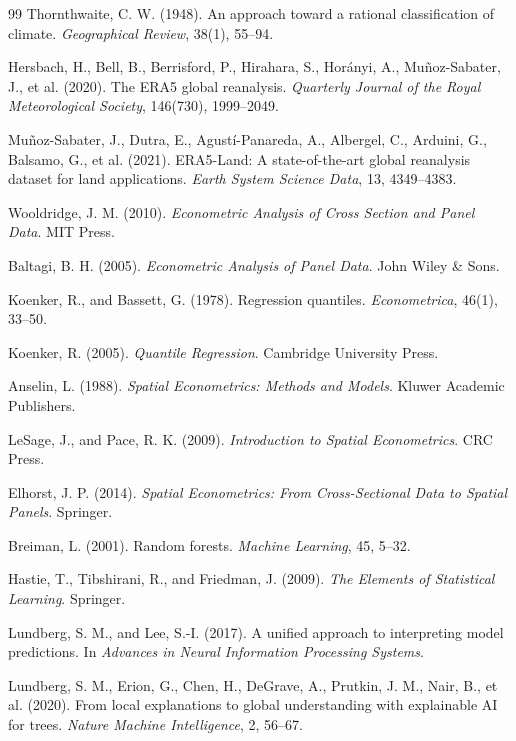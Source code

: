 \documentclass[12pt,a4paper]{article}
\begin{document}
\begin{thebibliography}{99}
Thornthwaite, C. W. (1948).
An approach toward a rational classification of climate.
\textit{Geographical Review}, 38(1), 55--94.

Hersbach, H., Bell, B., Berrisford, P., Hirahara, S., Hor{\'a}nyi, A., Mu{\~n}oz-Sabater, J., et al. (2020).
The ERA5 global reanalysis.
\textit{Quarterly Journal of the Royal Meteorological Society}, 146(730), 1999--2049.

Mu{\~n}oz-Sabater, J., Dutra, E., Agust{\'i}-Panareda, A., Albergel, C., Arduini, G., Balsamo, G., et al. (2021).
ERA5-Land: A state-of-the-art global reanalysis dataset for land applications.
\textit{Earth System Science Data}, 13, 4349--4383.

Wooldridge, J. M. (2010).
\textit{Econometric Analysis of Cross Section and Panel Data}.
MIT Press.

Baltagi, B. H. (2005).
\textit{Econometric Analysis of Panel Data}.
John Wiley \& Sons.

Koenker, R., and Bassett, G. (1978).
Regression quantiles.
\textit{Econometrica}, 46(1), 33--50.

Koenker, R. (2005).
\textit{Quantile Regression}.
Cambridge University Press.

Anselin, L. (1988).
\textit{Spatial Econometrics: Methods and Models}.
Kluwer Academic Publishers.

LeSage, J., and Pace, R. K. (2009).
\textit{Introduction to Spatial Econometrics}.
CRC Press.

Elhorst, J. P. (2014).
\textit{Spatial Econometrics: From Cross-Sectional Data to Spatial Panels}.
Springer.

Breiman, L. (2001).
Random forests.
\textit{Machine Learning}, 45, 5--32.

Hastie, T., Tibshirani, R., and Friedman, J. (2009).
\textit{The Elements of Statistical Learning}.
Springer.

Lundberg, S. M., and Lee, S.-I. (2017).
A unified approach to interpreting model predictions.
In \textit{Advances in Neural Information Processing Systems}.

Lundberg, S. M., Erion, G., Chen, H., DeGrave, A., Prutkin, J. M., Nair, B., et al. (2020).
From local explanations to global understanding with explainable AI for trees.
\textit{Nature Machine Intelligence}, 2, 56--67.


\end{thebibliography}
\end{document}
